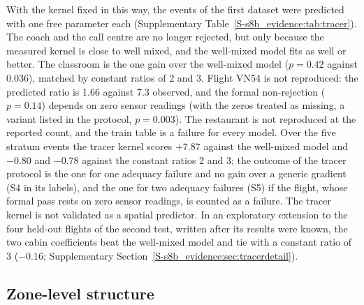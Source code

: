 With the kernel fixed in this way, the events of the first dataset were predicted with one free parameter each
(Supplementary Table~\ref{S-s8b_evidence:tab:tracer}). The coach and the call centre are no longer rejected, but only because the
measured kernel is close to well mixed, and the well-mixed model fits as well or better. The classroom is the one
gain over the well-mixed model ($p=0.42$ against $0.036$), matched by constant ratios of 2 and 3. Flight VN54 is
not reproduced: the predicted ratio is 1.66 against 7.3 observed, and the formal non-rejection ($p=0.14$) depends
on zero sensor readings (with the zeros treated as missing, a variant listed in the protocol, $p=0.003$). The
restaurant is not reproduced at the reported count, and the train table is a failure for every model. Over the
five stratum events the tracer kernel scores $+7.87$ against the well-mixed model and $-0.80$ and $-0.78$ against
the constant ratios 2 and 3; the outcome of the tracer protocol is the one for one adequacy failure and no gain over a generic gradient
(S4 in its labels), and the one for two adequacy failures (S5) if the flight, whose formal pass rests on zero
sensor readings, is counted as a failure. The tracer kernel is not
validated as a spatial predictor. In an exploratory extension to the four held-out flights of the second test,
written after its results were known, the two cabin coefficients beat the well-mixed model and tie with a
constant ratio of 3 ($-0.16$; Supplementary Section~\ref{S-s8b_evidence:sec:tracerdetail}).

\subsection{Zone-level structure}\label{s8b_evidence:sec:zones}

